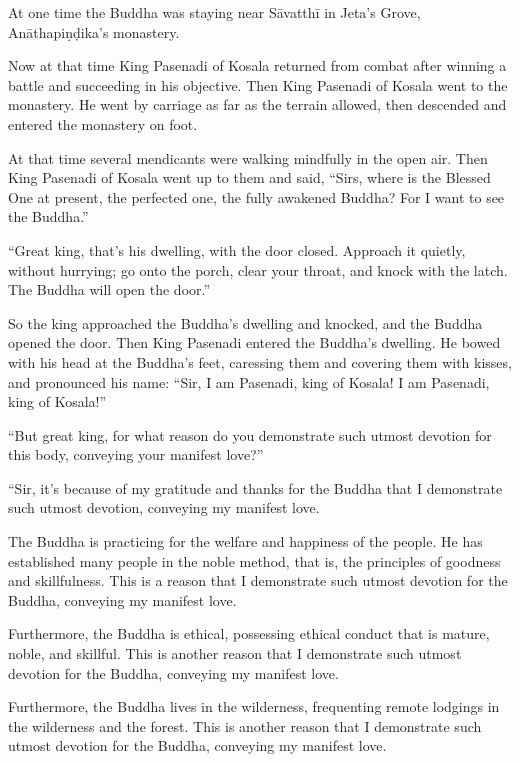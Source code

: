 \documentclass[12pt,openany]{book}%
\begin{document}
At one time the Buddha was staying near \textsanskrit{Sāvatthī} in Jeta’s Grove, \textsanskrit{Anāthapiṇḍika}’s monastery. 

Now at that time King Pasenadi of Kosala returned from combat after winning a battle and succeeding in his objective. Then King Pasenadi of Kosala went to the monastery. He went by carriage as far as the terrain allowed, then descended and entered the monastery on foot. 

At that time several mendicants were walking mindfully in the open air. Then King Pasenadi of Kosala went up to them and said, “Sirs, where is the Blessed One at present, the perfected one, the fully awakened Buddha? For I want to see the Buddha.” 

“Great king, that’s his dwelling, with the door closed. Approach it quietly, without hurrying; go onto the porch, clear your throat, and knock with the latch. The Buddha will open the door.” 

So the king approached the Buddha’s dwelling and knocked, and the Buddha opened the door. Then King Pasenadi entered the Buddha’s dwelling. He bowed with his head at the Buddha’s feet, caressing them and covering them with kisses, and pronounced his name: “Sir, I am Pasenadi, king of Kosala! I am Pasenadi, king of Kosala!” 

“But great king, for what reason do you demonstrate such utmost devotion for this body, conveying your manifest love?” 

“Sir, it’s because of my gratitude and thanks for the Buddha that I demonstrate such utmost devotion, conveying my manifest love. 

The Buddha is practicing for the welfare and happiness of the people. He has established many people in the noble method, that is, the principles of goodness and skillfulness. This is a reason that I demonstrate such utmost devotion for the Buddha, conveying my manifest love. 

Furthermore, the Buddha is ethical, possessing ethical conduct that is mature, noble, and skillful. This is another reason that I demonstrate such utmost devotion for the Buddha, conveying my manifest love. 

Furthermore, the Buddha lives in the wilderness, frequenting remote lodgings in the wilderness and the forest. This is another reason that I demonstrate such utmost devotion for the Buddha, conveying my manifest love. 
\end{document}
